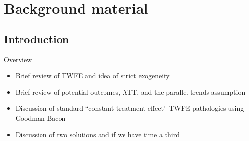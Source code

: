 \documentclass{beamer}
\begin{document}



\section{Background material}
\subsection{Introduction}


\begin{frame}{Overview}

\begin{itemize}

\item Brief review of TWFE and idea of strict exogeneity
\item Brief review of potential outcomes, ATT, and the parallel trends assumption
\item Discussion of standard ``constant treatment effect'' TWFE pathologies using Goodman-Bacon
\item Discussion of two solutions and if we have time a third
\end{itemize}

\end{frame}
\end{document}
